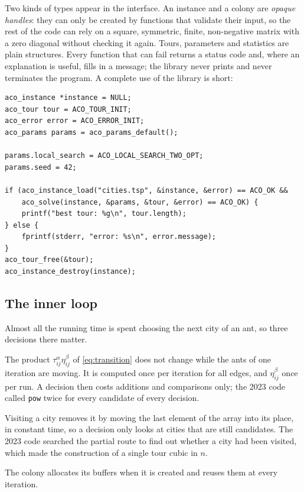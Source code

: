 \documentclass[11pt,a4paper]{article}
\newcommand{\code}[1]{\texttt{#1}}
\begin{document}
Two kinds of types appear in the interface. An instance and a colony are \emph{opaque
    handles}: they can only be created by functions that validate their input, so the rest of
the code can rely on a square, symmetric, finite, non-negative matrix with a zero diagonal
without checking it again. Tours, parameters and statistics are plain structures. Every
function that can fail returns a status code and, where an explanation is useful, fills in
a message; the library never prints and never terminates the program. A complete use of the
library is short:

\begin{lstlisting}[style=c]
aco_instance *instance = NULL;
aco_tour tour = ACO_TOUR_INIT;
aco_error error = ACO_ERROR_INIT;
aco_params params = aco_params_default();

params.local_search = ACO_LOCAL_SEARCH_TWO_OPT;
params.seed = 42;

if (aco_instance_load("cities.tsp", &instance, &error) == ACO_OK &&
    aco_solve(instance, &params, &tour, &error) == ACO_OK) {
    printf("best tour: %g\n", tour.length);
} else {
    fprintf(stderr, "error: %s\n", error.message);
}
aco_tour_free(&tour);
aco_instance_destroy(instance);
\end{lstlisting}

\subsection{The inner loop}

Almost all the running time is spent choosing the next city of an ant, so three decisions
there matter.

\begin{description}[leftmargin=0pt]
    \item[Attractiveness is tabulated.] The product $\tau_{ij}^{\alpha}\eta_{ij}^{\beta}$ of
          \cref{eq:transition} does not change while the ants of one iteration are moving. It is
          computed once per iteration for all edges, and $\eta_{ij}^{\beta}$ once per run. A
          decision then costs additions and comparisons only; the 2023 code called \code{pow}
          twice for every candidate of every decision.
    \item[Unvisited cities are kept in a compact array.] Visiting a city removes it by
          moving the last element of the array into its place, in constant time, so a decision
          only looks at cities that are still candidates. The 2023 code searched the partial
          route to find out whether a city had been visited, which made the construction of a
          single tour cubic in $n$.
    \item[Nothing is allocated.] The colony allocates its buffers when it is created and
          reuses them at every iteration.
\end{description}
\end{document}
